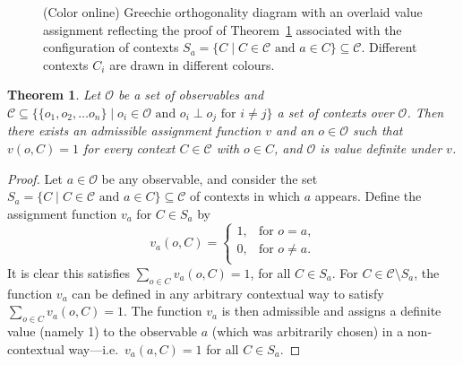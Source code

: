 \documentclass[%
 preprint,
 showpacs,
 showkeys,
 amsmath,
 amssymb,
 aps,
 pra,
 ]{revtex4-1}
\newtheorem{Theorem}{Theorem}
\theoremstyle{definition}
\begin{document}
\begin{figure}[h]
\begin{center}
\end{center}
\caption{(Color online)
Greechie orthogonality diagram with an overlaid value assignment reflecting the proof of Theorem~\ref{nostrongcontextuality}
associated with the configuration of contexts
$S_{a}=\{C \mid C\in \mathcal{C} \text{ and } a \in C \}\subseteq \mathcal{C}$.
Different contexts $C_i$ are drawn in different colours.
}
\label{2012-incomputability-proofs-f2}
\end{figure}
\begin{Theorem}
\label{nostrongcontextuality}
	Let $\mathcal{O}$ be a set of observables and $\mathcal{C}\subseteq \{\{o_1,o_2,\dots o_n\} \mid o_i \in \mathcal{O} \text{ and } o_i\perp o_j \text{ for } i\neq j \}$ a set of contexts over $\mathcal{O}$.
	Then there exists an admissible assignment function $v$ and an $o\in \mathcal{O}$ such that $v(o,C)=1$ for every context $C\in\mathcal{C}$ with $o \in C$, and $\mathcal{O}$ is value definite under $v$.
\end{Theorem}

\begin{proof}
	Let $a\in\mathcal{O}$ be any observable, and consider the set $S_{a}=\{C \mid C\in \mathcal{C} \text{ and } a \in C \}\subseteq \mathcal{C}$ of contexts in which $a$ appears.
	Define the assignment function $v_{a}$ for $C\in S_{a}$ by
	\begin{equation*}
		v_{a}(o,C) =
		\begin{cases}
			1, & \text{for $o=a$,}\\
			0, & \text{for  $o\neq a$.}\\
		\end{cases}
	\end{equation*}
	It is clear this satisfies $\sum_{o\in C}v_{a}(o,C)=1$, for all $C\in S_{a}$.
	For $C\in \mathcal{C}\setminus S_{a}$, the function $v_{a}$ can be defined in any arbitrary contextual way to satisfy $\sum_{o\in C}v_{a}(o,C)=1$.
The function $v_{a}$ is then admissible and assigns a definite value (namely 1) to the observable $a$ (which was arbitrarily chosen) in a non-contextual way---i.e.\ $v_a(a, C) = 1$ for all $C \in S_{a}$.
\end{proof}
\end{document}

